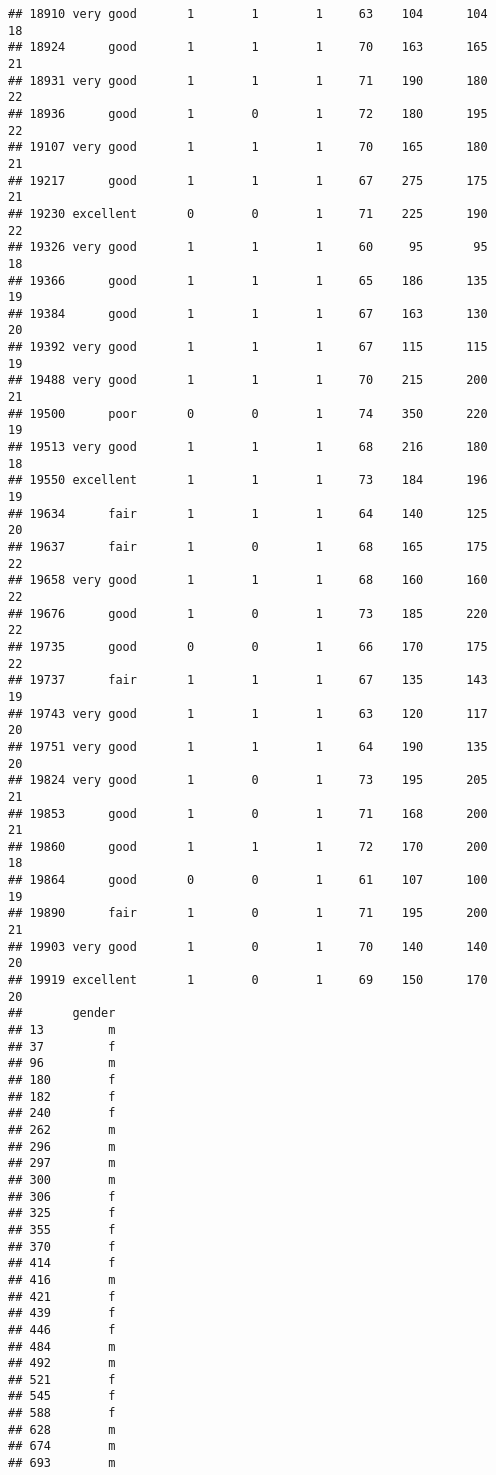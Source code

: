 \documentclass[]{article}
\begin{document}
\begin{verbatim}
## 18910 very good       1        1        1     63    104      104  18
## 18924      good       1        1        1     70    163      165  21
## 18931 very good       1        1        1     71    190      180  22
## 18936      good       1        0        1     72    180      195  22
## 19107 very good       1        1        1     70    165      180  21
## 19217      good       1        1        1     67    275      175  21
## 19230 excellent       0        0        1     71    225      190  22
## 19326 very good       1        1        1     60     95       95  18
## 19366      good       1        1        1     65    186      135  19
## 19384      good       1        1        1     67    163      130  20
## 19392 very good       1        1        1     67    115      115  19
## 19488 very good       1        1        1     70    215      200  21
## 19500      poor       0        0        1     74    350      220  19
## 19513 very good       1        1        1     68    216      180  18
## 19550 excellent       1        1        1     73    184      196  19
## 19634      fair       1        1        1     64    140      125  20
## 19637      fair       1        0        1     68    165      175  22
## 19658 very good       1        1        1     68    160      160  22
## 19676      good       1        0        1     73    185      220  22
## 19735      good       0        0        1     66    170      175  22
## 19737      fair       1        1        1     67    135      143  19
## 19743 very good       1        1        1     63    120      117  20
## 19751 very good       1        1        1     64    190      135  20
## 19824 very good       1        0        1     73    195      205  21
## 19853      good       1        0        1     71    168      200  21
## 19860      good       1        1        1     72    170      200  18
## 19864      good       0        0        1     61    107      100  19
## 19890      fair       1        0        1     71    195      200  21
## 19903 very good       1        0        1     70    140      140  20
## 19919 excellent       1        0        1     69    150      170  20
##       gender
## 13         m
## 37         f
## 96         m
## 180        f
## 182        f
## 240        f
## 262        m
## 296        m
## 297        m
## 300        m
## 306        f
## 325        f
## 355        f
## 370        f
## 414        f
## 416        m
## 421        f
## 439        f
## 446        f
## 484        m
## 492        m
## 521        f
## 545        f
## 588        f
## 628        m
## 674        m
## 693        m

\end{verbatim}
\end{document}
